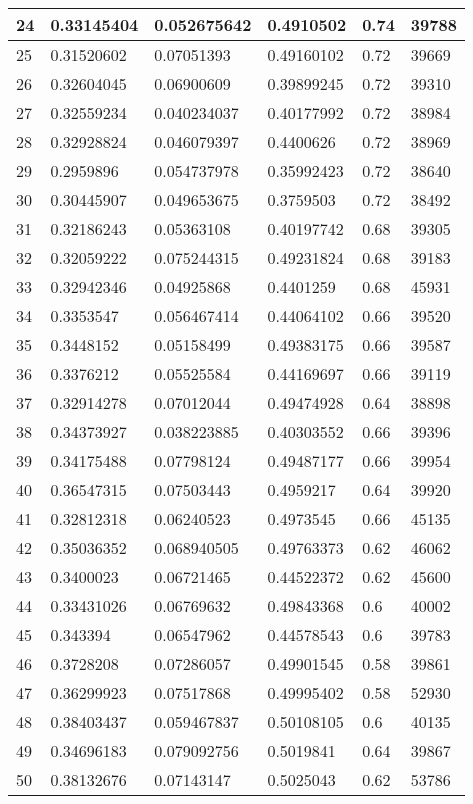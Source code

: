 \begin{longtable}{|l|l|l|l|l|l|}
24 & 0.33145404 & 0.052675642 & 0.4910502 & 0.74 & 39788 \\ \hline 
25 & 0.31520602 & 0.07051393 & 0.49160102 & 0.72 & 39669 \\ \hline 
26 & 0.32604045 & 0.06900609 & 0.39899245 & 0.72 & 39310 \\ \hline 
27 & 0.32559234 & 0.040234037 & 0.40177992 & 0.72 & 38984 \\ \hline 
28 & 0.32928824 & 0.046079397 & 0.4400626 & 0.72 & 38969 \\ \hline 
29 & 0.2959896 & 0.054737978 & 0.35992423 & 0.72 & 38640 \\ \hline 
30 & 0.30445907 & 0.049653675 & 0.3759503 & 0.72 & 38492 \\ \hline 
31 & 0.32186243 & 0.05363108 & 0.40197742 & 0.68 & 39305 \\ \hline 
32 & 0.32059222 & 0.075244315 & 0.49231824 & 0.68 & 39183 \\ \hline 
33 & 0.32942346 & 0.04925868 & 0.4401259 & 0.68 & 45931 \\ \hline 
34 & 0.3353547 & 0.056467414 & 0.44064102 & 0.66 & 39520 \\ \hline 
35 & 0.3448152 & 0.05158499 & 0.49383175 & 0.66 & 39587 \\ \hline 
36 & 0.3376212 & 0.05525584 & 0.44169697 & 0.66 & 39119 \\ \hline 
37 & 0.32914278 & 0.07012044 & 0.49474928 & 0.64 & 38898 \\ \hline 
38 & 0.34373927 & 0.038223885 & 0.40303552 & 0.66 & 39396 \\ \hline 
39 & 0.34175488 & 0.07798124 & 0.49487177 & 0.66 & 39954 \\ \hline 
40 & 0.36547315 & 0.07503443 & 0.4959217 & 0.64 & 39920 \\ \hline 
41 & 0.32812318 & 0.06240523 & 0.4973545 & 0.66 & 45135 \\ \hline 
42 & 0.35036352 & 0.068940505 & 0.49763373 & 0.62 & 46062 \\ \hline 
43 & 0.3400023 & 0.06721465 & 0.44522372 & 0.62 & 45600 \\ \hline 
44 & 0.33431026 & 0.06769632 & 0.49843368 & 0.6 & 40002 \\ \hline 
45 & 0.343394 & 0.06547962 & 0.44578543 & 0.6 & 39783 \\ \hline 
46 & 0.3728208 & 0.07286057 & 0.49901545 & 0.58 & 39861 \\ \hline 
47 & 0.36299923 & 0.07517868 & 0.49995402 & 0.58 & 52930 \\ \hline 
48 & 0.38403437 & 0.059467837 & 0.50108105 & 0.6 & 40135 \\ \hline 
49 & 0.34696183 & 0.079092756 & 0.5019841 & 0.64 & 39867 \\ \hline 
50 & 0.38132676 & 0.07143147 & 0.5025043 & 0.62 & 53786 \\ \hline 
\end{longtable}